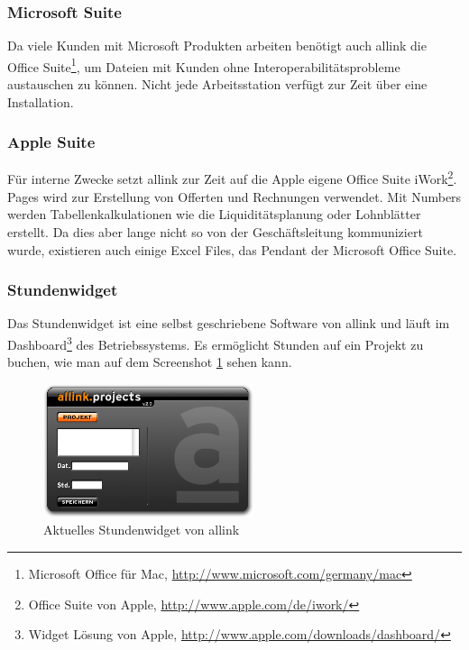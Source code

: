 \subsubsection{Microsoft Suite}
Da viele Kunden mit Microsoft Produkten arbeiten benötigt auch allink die
Office Suite\footnote{Microsoft Office für Mac, \url{http://www.microsoft.com/germany/mac}}, 
um Dateien mit Kunden ohne Interoperabilitätsprobleme
austauschen zu können. Nicht jede Arbeitsstation verfügt zur Zeit über eine
Installation.

\subsubsection{Apple Suite}
Für interne Zwecke setzt allink zur Zeit auf die Apple eigene Office Suite
iWork\footnote{Office Suite von Apple, \url{http://www.apple.com/de/iwork/}}.
Pages wird zur Erstellung von Offerten und Rechnungen verwendet. Mit Numbers
werden Tabellenkalkulationen wie die Liquiditätsplanung oder Lohnblätter erstellt.
Da dies aber lange nicht so von der Geschäftsleitung kommuniziert wurde, existieren
auch einige Excel Files, das Pendant der Microsoft Office Suite.

\subsubsection{Stundenwidget}
Das Stundenwidget ist eine selbst geschriebene Software von allink und läuft
im Dashboard\footnote{Widget Lösung von Apple, \url{http://www.apple.com/downloads/dashboard/}} des Betriebssystems.
Es ermöglicht Stunden auf ein Projekt zu buchen, wie man auf dem Screenshot \ref{pic:ist_widget}
sehen kann.

\begin{figure}[htbp]
\begin{center}
\includegraphics[width=0.55\textwidth,angle=0]{./bilder/ist_widget.png}
\caption{Aktuelles Stundenwidget von allink}
\label{pic:ist_widget}
\end{center}
\end{figure}

